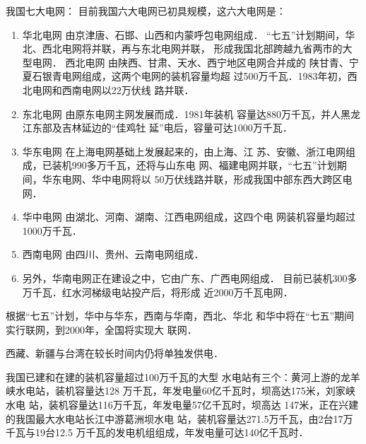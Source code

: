 我国七大电网：
目前我国六大电网已初具规模，这六大电网是：
\begin{enumerate}
\item 华北电网 由京津唐、石邯、山西和内蒙呼包电网组成．
“七五”计划期间，华北、西北电网将并联，再与东北电网并联，
形成我国北部跨越九省两市的大型电网．
西北电网 由陕西、甘肃、天水、西宁地区电网合并成的
陕甘青、宁夏石银青电网组成，这两个电网的装机容量均超
过500万千瓦．1983年初，西北电网和西南电网以22万伏线
路并联．
\item 东北电网 由原东电网主网发展而成．1981年装机
容量达880万千瓦，并人黑龙江东部及吉林延边的“佳鸡牡
延”电后，容量可达1000万千瓦．
\item 华东电网 在上海电网基础上发展起来的，由上海、江
苏、安徽、浙江电网组成，已装机990多万千瓦，还将与山东电
网、福建电网并联，“七五”计划期间，华东电网、华中电网将以
50万伏线路并联，形成我国中部东西大跨区电网．
\item 华中电网 由湖北、河南、湖南、江西电网组成，这四个电
网装机容量均超过1000万千瓦．
\item 西南电网 由四川、贵州、云南电网组成．
\item 另外，华南电网正在建设之中，它由广东、广西电网组成．
目前已装机300多万千瓦．红水河梯级电站投产后，将形成
近2000万千瓦电网．
\end{enumerate}

根据“七五”计划，华中与华东，西南与华南，西北、华北
和华中将在“七五”期间实行联网，到2000年，全国将实现大
联网．

西藏、新疆与台湾在较长时间内仍将单独发供电．

我国已建和在建的装机容量超过100万千瓦的大型
水电站有三个：黄河上游的龙羊峡水电站，装机容量达128
万千瓦，年发电量60亿千瓦时，坝高达175米，刘家峡水电
站，装机容量达116万千瓦，年发电量57亿千瓦时，坝高达
147米，正在兴建的我国最大水电站长江中游葛洲坝水电
站，装机容量达271.5万千瓦，由2台17万千瓦与19台12.5
万千瓦的发电机组组成，年发电量可达140亿千瓦时．


